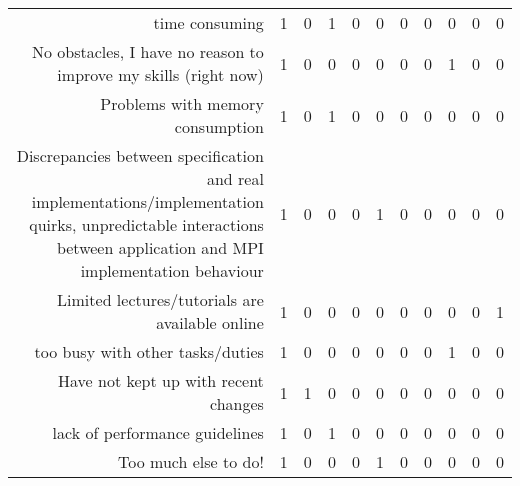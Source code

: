 {\begin{landscape}
\begin{longtable}[htb]{r|c|c|c|c|c|c|c|c|c|c}
{time consuming} & 1 & 0 & 1 & 0 & 0 & 0 & 0 & 0 & 0 & 0 \\%
{No obstacles, I have no reason to improve my skills (right now)} & 1 & 0 & 0 & 0 & 0 & 0 & 0 & 1 & 0 & 0 \\%
{Problems with memory consumption} & 1 & 0 & 1 & 0 & 0 & 0 & 0 & 0 & 0 & 0 \\%
{Discrepancies between specification and real implementations/implementation quirks, unpredictable interactions between application and MPI implementation behaviour} & 1 & 0 & 0 & 0 & 1 & 0 & 0 & 0 & 0 & 0 \\%
{Limited lectures/tutorials are available online} & 1 & 0 & 0 & 0 & 0 & 0 & 0 & 0 & 0 & 1 \\%
{too busy with other tasks/duties} & 1 & 0 & 0 & 0 & 0 & 0 & 0 & 1 & 0 & 0 \\%
{Have not kept up with recent changes} & 1 & 1 & 0 & 0 & 0 & 0 & 0 & 0 & 0 & 0 \\%
{lack of performance guidelines} & 1 & 0 & 1 & 0 & 0 & 0 & 0 & 0 & 0 & 0 \\%
{Too much else to do!} & 1 & 0 & 0 & 0 & 1 & 0 & 0 & 0 & 0 & 0 \\%
\hline%
\end{longtable}%
\end{landscape}}%
\clearpage%
